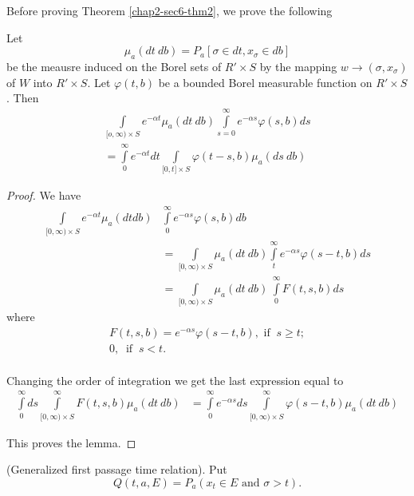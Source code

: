 Before proving Theorem \ref{chap2-sec6-thm2}, we prove the following 

\begin{lemma*}
Let
  $$
  \mu_a (dt\ db) = P_a [\sigma \in dt, x_{\sigma} \in  db]
  $$
  be the meausre induced on the Borel sets of $ R' \times S $ by the
  mapping $w \to (\sigma, x_\sigma)$ of $W$ into $R' \times S$. Let
  $\varphi(t, b)$ be a bounded Borel  measurable function on $R' \times
  S$. Then 
  \begin{multline*}
    \int \limits_{\big[ o, \infty ) \times S} e^{-\alpha t} \mu_a (dt
      ~ db ) \int \limits^{\infty}_{s=0} e^{-\alpha s} \varphi (s, b)
      ds \\
      = \int \limits^{\infty}_{0} e^{-\alpha t} dt \int \limits_{\big[
          0,t \big ] \times S} \varphi (t-s,b ) \mu_a (ds ~ db)
  \end{multline*}
\end{lemma*}

\begin{proof}
  We have 
  \begin{align*}
  \int\limits_{[ 0, \infty ) \times S} e^{-\alpha t} \mu_a (dt db)
    & \int\limits_{0}^{\infty} e^{-\alpha s} \varphi (s,b) db\\ 
    & = \int  
    \limits_{[ 0, \infty ) \times S} \mu_a (dt ~ db) \int \limits_{t}^{\infty}
      e^{-\alpha s} \varphi (s-t,b) ds\\ 
    & = \int \limits_{[ 0, \infty )
          \times S} \mu_a (dt ~ db) ~ \int \limits^{\infty}_{0} F
        (t,s,b) ds 
  \end{align*}
  where\pageoriginale
  \begin{gather*}
    F (t, s, b) = e^{-\alpha s} \varphi (s-t,b) , \text{ if } ~ s \ge t;\\
    0, ~ \text{ if } ~ s < t. \\
  \end{gather*}

Changing the order of integration we get the last expression equal to 
\begin{align*}
\int\limits^{\infty}_{0} ds \int \limits^{\infty}_{[ 0, \infty )
      \times S} F (t,s,b) \mu_a (dt ~ db)  
    &= \int \limits^{\infty}_{0} e^{-\alpha s} ds \int
    \limits^{\infty}_{[ 0, \infty ) \times S} \varphi (s-t,b) \mu_a
      (dt ~ db)
\end{align*}

This proves the lemma.
\end{proof}


\begin{thm}\label{chap2-sec6-thm2}%
(Generalized first passage time relation). Put 
$$
Q (t,a,E) = P_a (x_t \in E \text{ and } \sigma > t ).
$$
\end{thm}

